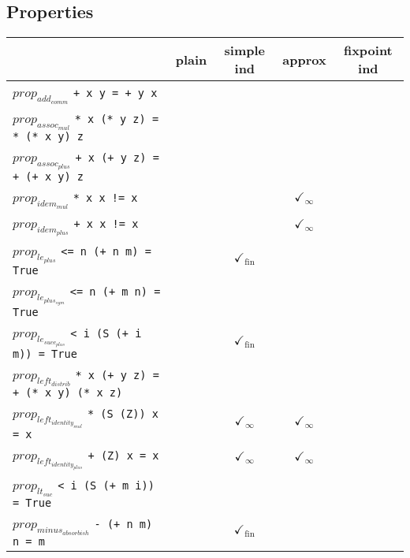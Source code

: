 \documentclass{article}
\begin{document}
\subsection*{Properties}
\begin{longtable}{p{10cm} || c | c | c | c | }
  & plain & simple ind & approx & fixpoint ind \\
\hline
$prop_{add_{comm}}$ \newline \verb`+ x y = + y x` &  &  &  &  \\
\hline
$prop_{assoc_{mul}}$ \newline \verb`* x (* y z) = * (* x y) z` &  &  &  &  \\
\hline
$prop_{assoc_{plus}}$ \newline \verb`+ x (+ y z) = + (+ x y) z` &  &  &  &  \\
\hline
$prop_{idem_{mul}}$ \newline \verb`* x x != x` &  &  & $\checkmark_{\infty}$ &  \\
\hline
$prop_{idem_{plus}}$ \newline \verb`+ x x != x` &  &  & $\checkmark_{\infty}$ &  \\
\hline
$prop_{le_{plus}}$ \newline \verb`<= n (+ n m) = True` &  & $\checkmark_{\mathrm{fin}}$ &  &  \\
\hline
$prop_{le_{plus_{sym}}}$ \newline \verb`<= n (+ m n) = True` &  &  &  &  \\
\hline
$prop_{le_{succ_{plus}}}$ \newline \verb`< i (S (+ i m)) = True` &  & $\checkmark_{\mathrm{fin}}$ &  &  \\
\hline
$prop_{left_{distrib}}$ \newline \verb`* x (+ y z) = + (* x y) (* x z)` &  &  &  &  \\
\hline
$prop_{left_{identity_{mul}}}$ \newline \verb`* (S (Z)) x = x` &  & $\checkmark_{\infty}$ & $\checkmark_{\infty}$ &  \\
\hline
$prop_{left_{identity_{plus}}}$ \newline \verb`+ (Z) x = x` &  & $\checkmark_{\infty}$ & $\checkmark_{\infty}$ &  \\
\hline
$prop_{lt_{suc}}$ \newline \verb`< i (S (+ m i)) = True` &  &  &  &  \\
\hline
$prop_{minus_{absorbish}}$ \newline \verb`- (+ n m) n = m` &  & $\checkmark_{\mathrm{fin}}$ &  &  \\

\end{longtable}
\end{document}
